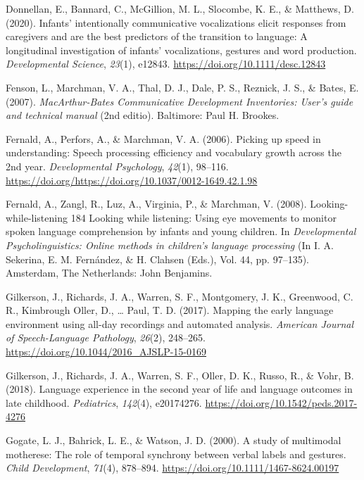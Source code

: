 \documentclass[
  english,
  man,floatsintext]{apa6}
\begin{document}
\leavevmode\hypertarget{ref-donnellan_infants_2020}{}%
Donnellan, E., Bannard, C., McGillion, M. L., Slocombe, K. E., \& Matthews, D. (2020). Infants' intentionally communicative vocalizations elicit responses from caregivers and are the best predictors of the transition to language: A longitudinal investigation of infants' vocalizations, gestures and word production. \emph{Developmental Science}, \emph{23}(1), e12843. \url{https://doi.org/10.1111/desc.12843}

\leavevmode\hypertarget{ref-fenson_macarthur-bates_2007}{}%
Fenson, L., Marchman, V. A., Thal, D. J., Dale, P. S., Reznick, J. S., \& Bates, E. (2007). \emph{MacArthur-Bates Communicative Development Inventories: User's guide and technical manual} (2nd editio). Baltimore: Paul H. Brookes.

\leavevmode\hypertarget{ref-fernald_picking_2006}{}%
Fernald, A., Perfors, A., \& Marchman, V. A. (2006). Picking up speed in understanding: Speech processing efficiency and vocabulary growth across the 2nd year. \emph{Developmental Psychology}, \emph{42}(1), 98--116. \url{https://doi.org/https://doi.org/10.1037/0012-1649.42.1.98}

\leavevmode\hypertarget{ref-fernald_looking-while-listening_2008}{}%
Fernald, A., Zangl, R., Luz, A., Virginia, P., \& Marchman, V. (2008). Looking-while-listening 184 Looking while listening: Using eye movements to monitor spoken language comprehension by infants and young children. In \emph{Developmental Psycholinguistics: Online methods in children's language processing} (In I. A. Sekerina, E. M. Fernández, \& H. Clahsen (Eds.), Vol. 44, pp. 97--135). Amsterdam, The Netherlands: John Benjamins.

\leavevmode\hypertarget{ref-gilkerson_mapping_2017}{}%
Gilkerson, J., Richards, J. A., Warren, S. F., Montgomery, J. K., Greenwood, C. R., Kimbrough Oller, D., \ldots{} Paul, T. D. (2017). Mapping the early language environment using all-day recordings and automated analysis. \emph{American Journal of Speech-Language Pathology}, \emph{26}(2), 248--265. \url{https://doi.org/10.1044/2016_AJSLP-15-0169}

\leavevmode\hypertarget{ref-gilkerson_language_2018}{}%
Gilkerson, J., Richards, J. A., Warren, S. F., Oller, D. K., Russo, R., \& Vohr, B. (2018). Language experience in the second year of life and language outcomes in late childhood. \emph{Pediatrics}, \emph{142}(4), e20174276. \url{https://doi.org/10.1542/peds.2017-4276}

\leavevmode\hypertarget{ref-gogate_study_2000}{}%
Gogate, L. J., Bahrick, L. E., \& Watson, J. D. (2000). A study of multimodal motherese: The role of temporal synchrony between verbal labels and gestures. \emph{Child Development}, \emph{71}(4), 878--894. \url{https://doi.org/10.1111/1467-8624.00197}
\end{document}
